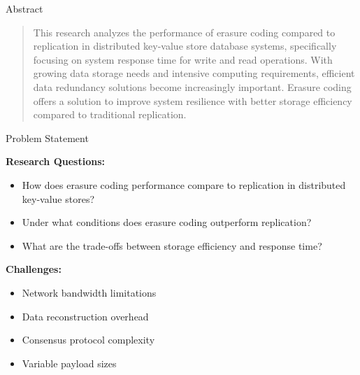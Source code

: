 \documentclass[a0,landscape]{config/poster/a0poster}
\newcommand{\postersection}[1]{%
  \begin{tcolorbox}[
      colback=ITBblue,
      colframe=ITBblue,
      fonttitle=\bfseries,
      coltext=white,
      sharp corners,
      boxrule=0pt,
      top=6pt,
      bottom=6pt,
      halign=center
    ]
    \Large #1
  \end{tcolorbox}%
}
\begin{document}
\vspace{1cm} %


\begin{multicols}{4} %


	\postersection{Abstract}
	\begin{quote}
		This research analyzes the performance of erasure coding compared to replication in distributed key-value store database systems, specifically focusing on system response time for write and read operations. With growing data storage needs and intensive computing requirements, efficient data redundancy solutions become increasingly important. Erasure coding offers a solution to improve system resilience with better storage efficiency compared to traditional replication.
	\end{quote}


	\postersection{Problem Statement}
	
	\textbf{Research Questions:}
	\begin{itemize}
		\item How does erasure coding performance compare to replication in distributed key-value stores?
		\item Under what conditions does erasure coding outperform replication?
		\item What are the trade-offs between storage efficiency and response time?
	\end{itemize}

	\textbf{Challenges:}
	\begin{itemize}
		\item Network bandwidth limitations
		\item Data reconstruction overhead
		\item Consensus protocol complexity
		\item Variable payload sizes
	\end{itemize}


\end{multicols}
\end{document}
